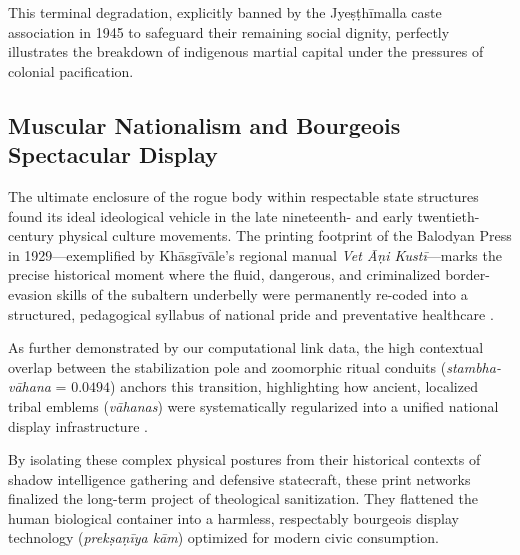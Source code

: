 \documentclass[11pt,twoside,letterpaper]{article}
\begin{document}
This terminal degradation, explicitly banned by the Jyeṣṭhīmalla caste association in 1945 to safeguard their remaining social dignity, perfectly illustrates the breakdown of indigenous martial capital under the pressures of colonial pacification.

\subsection{Muscular Nationalism and Bourgeois Spectacular Display}
The ultimate enclosure of the rogue body within respectable state structures found its ideal ideological vehicle in the late nineteenth- and early twentieth-century physical culture movements. The printing footprint of the Balodyan Press in 1929—exemplified by Khāsgīvāle’s regional manual \textit{Vet Āṇi Kustī}—marks the precise historical moment where the fluid, dangerous, and criminalized border-evasion skills of the subaltern underbelly were permanently re-coded into a structured, pedagogical syllabus of national pride and preventative healthcare \citep{Khasgivale1929}. 

As further demonstrated by our computational link data, the high contextual overlap between the stabilization pole and zoomorphic ritual conduits (\textit{stambha-vāhana} = $0.0494$) anchors this transition, highlighting how ancient, localized tribal emblems (\textit{vāhanas}) were systematically regularized into a unified national display infrastructure \citep{Abbasi2001}. 

By isolating these complex physical postures from their historical contexts of shadow intelligence gathering and defensive statecraft, these print networks finalized the long-term project of theological sanitization. They flattened the human biological container into a harmless, respectably bourgeois display technology (\textit{prekṣaṇīya kām}) optimized for modern civic consumption.
\end{document}
